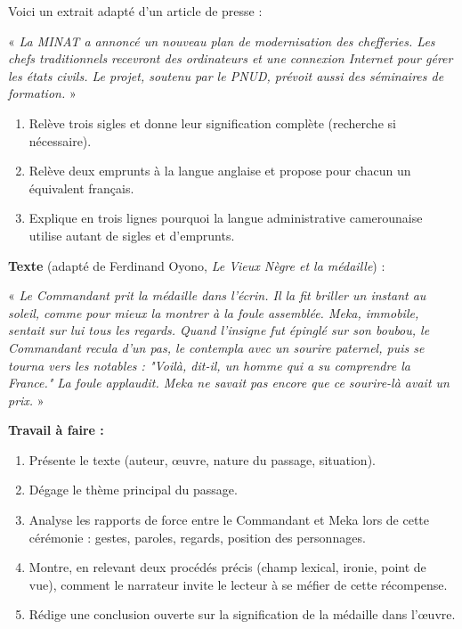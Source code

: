 \documentclass[11pt]{article}
\newcounter{popsec}
\newcounter{popsub}
\newcommand{\courssub}[1]{%
  \stepcounter{popsub}%
  \par\vspace{9pt}\noindent{\popxbold\fontsize{11.5}{13}\selectfont\color{popink}{\color{poporange}\thepopsec.\thepopsub}\hspace{6pt}#1}\par\nopagebreak\vspace{4pt}
}
\begin{document}
\begin{exercice}
Voici un extrait adapté d'un article de presse :

« \emph{La MINAT a annoncé un nouveau plan de modernisation des chefferies. Les chefs traditionnels recevront des ordinateurs et une connexion Internet pour gérer les états civils. Le projet, soutenu par le PNUD, prévoit aussi des séminaires de formation.} »

\begin{enumerate}
\item Relève trois sigles et donne leur signification complète (recherche si nécessaire).
\item Relève deux emprunts à la langue anglaise et propose pour chacun un équivalent français.
\item Explique en trois lignes pourquoi la langue administrative camerounaise utilise autant de sigles et d'emprunts.
\end{enumerate}
\end{exercice}

\courssub{Je me prépare au Bac}

\begin{exercice}
\textbf{Texte} (adapté de Ferdinand Oyono, \emph{Le Vieux Nègre et la médaille}) :

« \emph{Le Commandant prit la médaille dans l'écrin. Il la fit briller un instant au soleil, comme pour mieux la montrer à la foule assemblée. Meka, immobile, sentait sur lui tous les regards. Quand l'insigne fut épinglé sur son boubou, le Commandant recula d'un pas, le contempla avec un sourire paternel, puis se tourna vers les notables : "Voilà, dit-il, un homme qui a su comprendre la France." La foule applaudit. Meka ne savait pas encore que ce sourire-là avait un prix.} »

\textbf{Travail à faire :}
\begin{enumerate}
\item Présente le texte (auteur, œuvre, nature du passage, situation).
\item Dégage le thème principal du passage.
\item Analyse les rapports de force entre le Commandant et Meka lors de cette cérémonie : gestes, paroles, regards, position des personnages.
\item Montre, en relevant deux procédés précis (champ lexical, ironie, point de vue), comment le narrateur invite le lecteur à se méfier de cette récompense.
\item Rédige une conclusion ouverte sur la signification de la médaille dans l'œuvre.
\end{enumerate}
\end{exercice}
\end{document}
